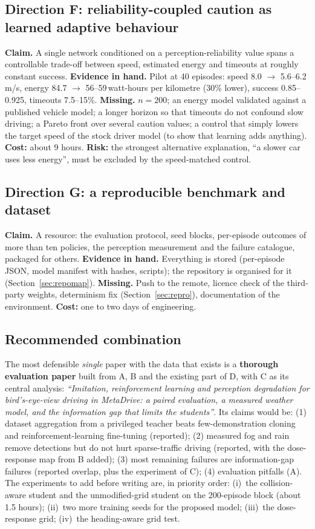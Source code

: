 \subsection{Direction F: reliability-coupled caution as learned adaptive behaviour}
\textbf{Claim.} A single network conditioned on a perception-reliability value spans a controllable trade-off between speed, estimated energy and timeouts at roughly constant success.
\textbf{Evidence in hand.} Pilot at 40 episodes: speed 8.0 $\to$ 5.6--6.2\,m/s, energy 84.7 $\to$ 56--59\,watt-hours per kilometre (30\% lower), success 0.85--0.925, timeouts 7.5--15\%.
\textbf{Missing.} $n=200$; an energy model validated against a published vehicle model; a longer horizon so that timeouts do not confound slow driving; a Pareto front over several caution values; a control that simply lowers the target speed of the stock driver model (to show that learning adds anything). \textbf{Cost:} about 9 hours. \textbf{Risk:} the strongest alternative explanation, ``a slower car uses less energy'', must be excluded by the speed-matched control.

\subsection{Direction G: a reproducible benchmark and dataset}
\textbf{Claim.} A resource: the evaluation protocol, seed blocks, per-episode outcomes of more than ten policies, the perception measurement and the failure catalogue, packaged for others.
\textbf{Evidence in hand.} Everything is stored (per-episode JSON, model manifest with hashes, scripts); the repository is organised for it (Section~\ref{sec:repomap}).
\textbf{Missing.} Push to the remote, licence check of the third-party weights, determinism fix (Section~\ref{sec:repro}), documentation of the environment. \textbf{Cost:} one to two days of engineering.

\subsection{Recommended combination}
The most defensible \emph{single} paper with the data that exists is a \textbf{thorough evaluation paper} built from A, B and the existing part of D, with C as its central analysis: \emph{``Imitation, reinforcement learning and perception degradation for bird's-eye-view driving in MetaDrive: a paired evaluation, a measured weather model, and the information gap that limits the students''}.
Its claims would be: (1) dataset aggregation from a privileged teacher beats few-demonstration cloning and reinforcement-learning fine-tuning (reported); (2) measured fog and rain remove detections but do not hurt sparse-traffic driving (reported, with the dose-response map from B added); (3) most remaining failures are information-gap failures (reported overlap, plus the experiment of C); (4) evaluation pitfalls (A).
The experiments to add before writing are, in priority order: (i)~the collision-aware student and the unmodified-grid student on the 200-episode block (about 1.5 hours); (ii)~two more training seeds for the proposed model; (iii)~the dose-response grid; (iv)~the heading-aware grid test.
